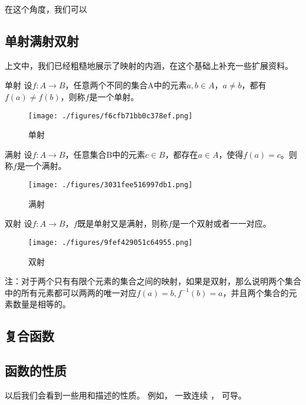 在这个角度，我们可以


\subsection{单射满射双射}

上文中，我们已经粗糙地展示了映射的内涵，在这个基础上补充一些扩展资料。

\begin{definition}{单射}
设$f:A\to{B}$，任意两个不同的集合A中的元素$a,b\in{A}$，$a\not={b}$，都有$f(a)\not={f(b)}$，则称$f$是一个单射。
\end{definition}

\begin{figure}[ht]
\centering
\texttt{[image: ./figures/f6cfb71bb0c378ef.png]}
\caption{单射}\label{fig_functi_2}
\end{figure}

\begin{definition}{满射}
设$f:A\to{B}$，任意集合B中的元素$c\in{B}$，都存在$a\in{A}$，使得$f(a)=c$。则称$f$是一个满射。
\end{definition}

\begin{figure}[ht]
\centering
\texttt{[image: ./figures/3031fee516997db1.png]}
\caption{满射} \label{fig_functi_3}
\end{figure}


\begin{definition}{双射}
设$f:A\to{B}$，$f$既是单射又是满射，则称$f$是一个双射或者一一对应。
\end{definition}

\begin{figure}[ht]
\centering
\texttt{[image: ./figures/9fef429051c64955.png]}
\caption{双射} \label{fig_functi_4}
\end{figure}

注：对于两个只有有限个元素的集合之间的映射，如果是双射，那么说明两个集合中的所有元素都可以两两的唯一对应$f(a)=b,f^{-1}(b)=a$，并且两个集合的元素数量是相等的。


\subsection{复合函数}


\subsection{函数的性质}
以后我们会看到一些用和描述的性质。 例如， 一致连续 %
， 可导。
